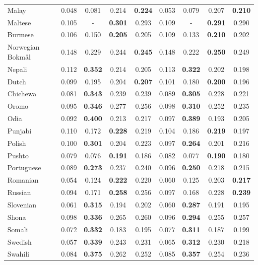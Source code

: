 \begin{longtable}{lcccccccc}
Malay & 0.048 & 0.081 & 0.214 & \textbf{0.224} & 0.053 & 0.079 & 0.207 & \textbf{0.210} \\
Maltese & 0.105 & - & \textbf{0.301} & 0.293 & 0.109 & - & \textbf{0.291} & 0.290 \\
Burmese & 0.106 & 0.150 & \textbf{0.205} & 0.205 & 0.109 & 0.133 & \textbf{0.210} & 0.202 \\
Norwegian Bokmål & 0.148 & 0.229 & 0.244 & \textbf{0.245} & 0.148 & 0.222 & \textbf{0.250} & 0.249 \\
Nepali & 0.112 & \textbf{0.352} & 0.214 & 0.205 & 0.113 & \textbf{0.322} & 0.202 & 0.198 \\
Dutch & 0.099 & 0.195 & 0.204 & \textbf{0.207} & 0.101 & 0.180 & \textbf{0.200} & 0.196 \\
Chichewa & 0.081 & \textbf{0.343} & 0.239 & 0.239 & 0.089 & \textbf{0.305} & 0.228 & 0.221 \\
Oromo & 0.095 & \textbf{0.346} & 0.277 & 0.256 & 0.098 & \textbf{0.310} & 0.252 & 0.235 \\
Odia & 0.092 & \textbf{0.400} & 0.213 & 0.217 & 0.097 & \textbf{0.389} & 0.193 & 0.205 \\
Punjabi & 0.110 & 0.172 & \textbf{0.228} & 0.219 & 0.104 & 0.186 & \textbf{0.219} & 0.197 \\
Polish & 0.100 & \textbf{0.301} & 0.204 & 0.223 & 0.097 & \textbf{0.264} & 0.201 & 0.216 \\
Pushto & 0.079 & 0.076 & \textbf{0.191} & 0.186 & 0.082 & 0.077 & \textbf{0.190} & 0.180 \\
Portuguese & 0.089 & \textbf{0.273} & 0.237 & 0.240 & 0.096 & \textbf{0.250} & 0.218 & 0.215 \\
Romanian & 0.054 & 0.124 & \textbf{0.222} & 0.220 & 0.060 & 0.125 & 0.203 & \textbf{0.217} \\
Russian & 0.094 & 0.171 & \textbf{0.258} & 0.256 & 0.097 & 0.168 & 0.228 & \textbf{0.239} \\
Slovenian & 0.061 & \textbf{0.315} & 0.194 & 0.202 & 0.060 & \textbf{0.287} & 0.191 & 0.195 \\
Shona & 0.098 & \textbf{0.336} & 0.265 & 0.260 & 0.096 & \textbf{0.294} & 0.255 & 0.257 \\
Somali & 0.072 & \textbf{0.332} & 0.183 & 0.195 & 0.077 & \textbf{0.311} & 0.187 & 0.199 \\
Swedish & 0.057 & \textbf{0.339} & 0.243 & 0.231 & 0.065 & \textbf{0.312} & 0.230 & 0.218 \\
Swahili & 0.084 & \textbf{0.375} & 0.262 & 0.252 & 0.085 & \textbf{0.357} & 0.254 & 0.236 \\

\end{longtable}
